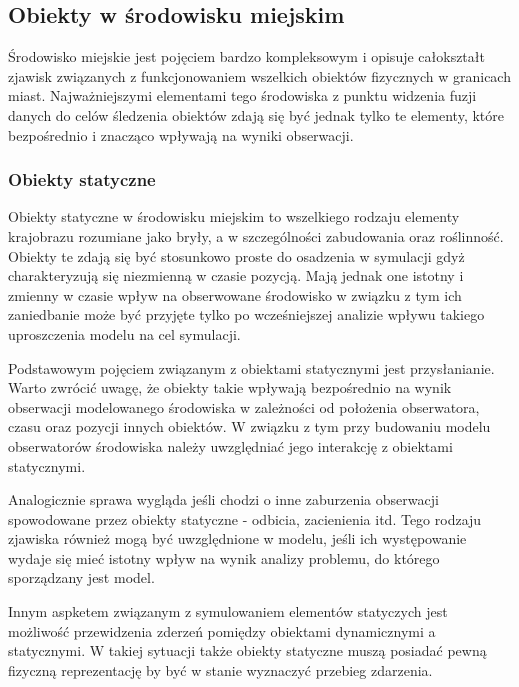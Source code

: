 \subsection{Obiekty w środowisku miejskim}
\par{
Środowisko miejskie jest pojęciem bardzo kompleksowym i opisuje całokształt zjawisk związanych z funkcjonowaniem wszelkich obiektów fizycznych w granicach miast. Najważniejszymi elementami tego środowiska z punktu widzenia fuzji danych do celów śledzenia obiektów zdają się być jednak tylko te elementy, które bezpośrednio i znacząco wpływają na wyniki obserwacji.
}
\subsubsection{Obiekty statyczne}
\par{
Obiekty statyczne w środowisku miejskim to wszelkiego rodzaju elementy krajobrazu rozumiane jako bryły, a w szczególności zabudowania oraz roślinność. Obiekty te zdają się być stosunkowo proste do osadzenia w symulacji gdyż charakteryzują się niezmienną w czasie pozycją. Mają jednak one istotny i zmienny w czasie wpływ na obserwowane środowisko w związku z tym ich zaniedbanie może być przyjęte tylko po wcześniejszej analizie wpływu takiego uproszczenia modelu na cel symulacji.
}
\par{
Podstawowym pojęciem związanym z obiektami statycznymi jest przysłanianie. Warto zwrócić uwagę, że obiekty takie wpływają bezpośrednio na wynik obserwacji modelowanego środowiska w zależności od położenia obserwatora, czasu oraz pozycji innych obiektów. W związku z tym przy budowaniu modelu  obserwatorów środowiska należy uwzględniać jego interakcję z obiektami statycznymi.
}
\par{
Analogicznie sprawa wygląda jeśli chodzi o inne zaburzenia obserwacji spowodowane przez obiekty statyczne - odbicia, zacienienia itd. Tego rodzaju zjawiska również mogą być uwzględnione w modelu, jeśli ich występowanie wydaje się mieć istotny wpływ na wynik analizy problemu, do którego sporządzany jest model.
}
\par{
Innym aspketem związanym z symulowaniem elementów statyczych jest możliwość przewidzenia zderzeń pomiędzy obiektami dynamicznymi a statycznymi. W takiej sytuacji także obiekty statyczne muszą posiadać pewną fizyczną reprezentację by być w stanie wyznaczyć przebieg zdarzenia.
}
